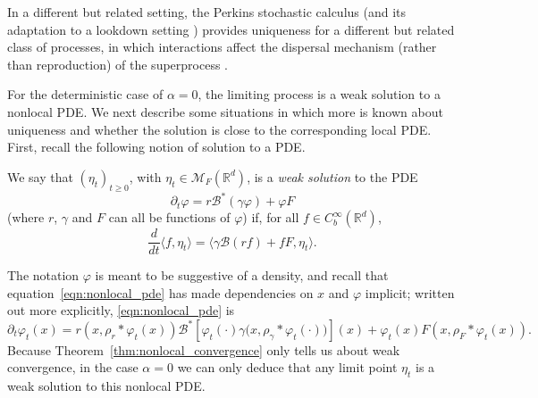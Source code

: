 \documentclass[EJP]{ejpecp} %
\newcommand{\IR}{\mathbb R}
\newcommand{\DG}{\mathcal{B}}  %
\newcommand{\kernel}{\rho}  %
\newcommand{\smooth}[1]{\kernel_{#1} \! * \!}  %
\newcommand{\measures}{\mathcal{M}_F(\IR^d)} %
\begin{document}
In a different but related setting, the Perkins stochastic calculus
(and its adaptation to a lookdown setting \cite{donnelly/kurtz:1999})
provides uniqueness for a different but related class of processes,
in which interactions affect the dispersal mechanism
(rather than reproduction) of the superprocess \cite{perkins:1992}.

For the deterministic case of $\alpha=0$,
the limiting process is a weak solution to a nonlocal PDE.
We next describe some situations in which more is known
about uniqueness and whether the solution is close to the corresponding local PDE.
First, recall the following notion of solution to a PDE.
\begin{definition}
    \label{defn:weak_solutions}
    We say that $(\eta_t)_{t \ge 0}$, with $\eta_t \in \measures$,
    is a \emph{weak solution} to the PDE
    \begin{equation} \label{eqn:nonlocal_pde}
        \partial_t \varphi = r \DG^*(\gamma \varphi) + \varphi F
    \end{equation}
	(where $r$, $\gamma$ and $F$ can all be functions of $\varphi$)
    if, for all $f \in C_b^\infty(\IR^d)$,
    \[
        \frac{d}{dt} \langle f, \eta_t \rangle
        =
        \langle
	    \gamma \DG(rf) + f F,
            \eta_t
        \rangle .
    \]
\end{definition}
The notation $\varphi$ is meant to be suggestive of a density,
and recall that equation~\eqref{eqn:nonlocal_pde} has made dependencies on $x$ and $\varphi$ implicit;
written out more explicitly, \eqref{eqn:nonlocal_pde} is
\[
    \partial_t \varphi_t(x)
    =
    r\left(x, \smooth{r} \varphi_t(x) \right)
    \DG^* \left[
        \varphi_t(\cdot)
        \gamma\big( x, \smooth{\gamma} \varphi_t(\cdot) \big)
    \right](x)
    +
    \varphi_t(x)
    F\left(x, \smooth{F} \varphi_t(x) \right)
    .
\]
Because Theorem~\ref{thm:nonlocal_convergence} only tells us about 
weak convergence, in the case $\alpha=0$ we can only deduce that 
any limit point $\eta_t$ is a weak solution to this nonlocal PDE.
\end{document}
